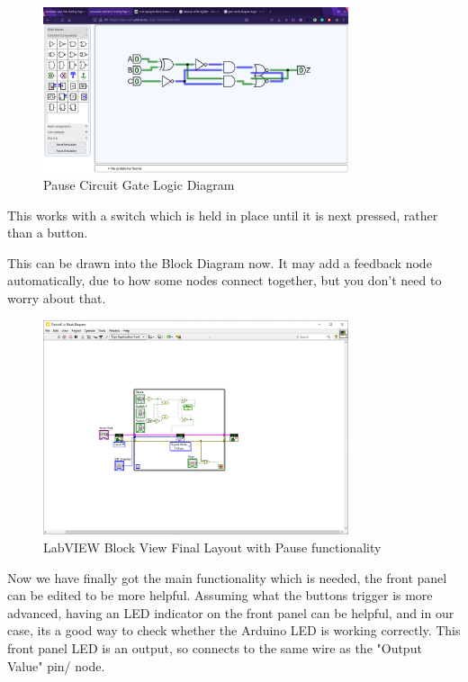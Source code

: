 \documentclass[a4paper,11pt]{report}
\begin{document}
\begin{figure}[H]
\centering
\includegraphics[width=0.8\textwidth]{screenshots/pausecircuitlatchgates}
\caption{Pause Circuit Gate Logic Diagram}
\end{figure}

This works with a switch which is held in place until it is next pressed, rather than a button.

This can be drawn into the Block Diagram now. It may add a feedback node automatically, due to how some nodes connect together, but you don't need to worry about that.

\begin{figure}[H]
\centering
\includegraphics[width=0.8\textwidth]{screenshots/labview33}
\caption{LabVIEW Block View Final Layout with Pause functionality}
\end{figure}

Now we have finally got the main functionality which is needed, the front panel can be edited to be more helpful. Assuming what the buttons trigger is more advanced, having an LED indicator on the front panel can be helpful, and in our case, its a good way to check whether the Arduino LED is working correctly. This front panel LED is an output, so connects to the same wire as the "Output Value" pin/ node.
\end{document}
